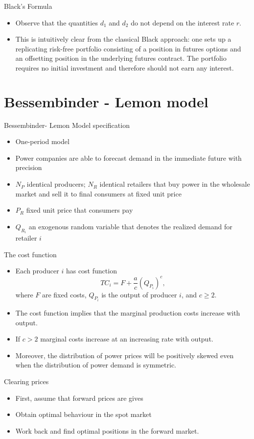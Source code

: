 {Black's Formula}
\begin{itemize}
\item<1->
Observe that the quantities $d_1$ and $d_2$ do not depend on the
interest rate $r$.
\item<2-> This is intuitively clear from the classical
Black approach: one sets up a replicating risk-free portfolio
consisting of a position in futures options and an offsetting
position in the underlying futures contract. The portfolio
requires no initial investment and therefore should not earn any
interest.
\end{itemize}

\section{Bessembinder - Lemon model}

{Bessembinder- Lemon Model specification}
\begin{itemize}
\item<1-> One-period model
\item<2-> Power companies are able to forecast demand in the immediate future with precision
\item<3-> $N_P$ identical producers; $N_R$ identical retailers that buy power in the wholesale market and sell it to final consumers at fixed unit price
\item<4-> $P_R$ fixed unit price that consumers pay
\item<5-> $Q_{R_i}$ an exogenous random variable that denotes the realized demand for retailer $i$
\end{itemize}

{The cost function}
\begin{itemize}
\item<1-> Each producer $i$ has cost function
$$
TC_i=F+\frac{a}{c}(Q_{P_i})^c,
$$
where $F$ are fixed costs, $Q_{P_i}$ is the output of producer $i$, and $c\geq 2$.
\item<2-> The cost function implies that the marginal production costs increase with output.
\item<3-> If $c>2$ marginal costs increase at an increasing rate with output.
\item<4-> Moreover, the distribution of power prices will be positively skewed even when the distribution of power demand is symmetric.
\end{itemize}

{Clearing prices}
\begin{itemize}
\item<1-> First, assume that forward prices are gives
\item<2-> Obtain optimal behaviour in the spot market
\item<3-> Work back and find optimal positions in the forward market.
\end{itemize}

